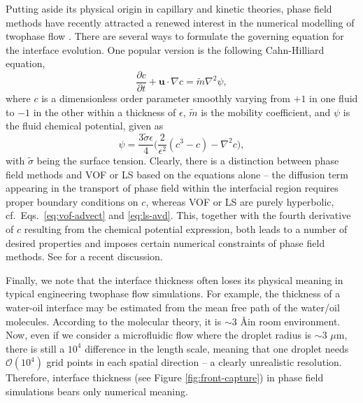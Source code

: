 Putting aside its physical origin in capillary and kinetic theories, phase field methods have recently attracted a renewed interest in the numerical modelling of twophase flow \citep{jacqmin_1999a, Jacqmin2000, Badalassi_etal_2003, Ding_Spelt_Shu2007, Shen_Yang_2010, dong_shen_2012a, Wang_Shu_Shao_Wu_Niu_2015, Martin, Mirjalili_Ivey_Mani_2020}.
There are several ways to formulate the governing equation for the interface evolution. One popular version is the following Cahn-Hilliard equation,
\begin{equation} \label{eq:C-H}
  \frac{\partial c}{\partial t} + {\bm u}\cdot \nabla c =\tilde{m}\nabla ^2 \psi,
\end{equation}
where $c$ is a dimensionless order parameter smoothly varying from $+1$ in one fluid to $-1$ in the other within a thickness of $\epsilon$,
$\tilde{m}$ is the mobility coefficient,
and $\psi$ is the fluid chemical potential, given as
\begin{equation} \label{eq:ch-chem}
  \psi = \frac{3\tilde{\sigma} \epsilon}{4} 
  \bigg(\frac{2}{\epsilon^2}(c^3-c) -\nabla ^2 c \bigg),
\end{equation}
with $\tilde{\sigma}$ being the surface tension.
Clearly, there is a distinction between phase field methods and VOF or LS based on the equations alone --
the diffusion term appearing in the transport of phase field within the interfacial region requires proper boundary conditions on $c$, whereas VOF or LS are purely hyperbolic, cf.\ Eqs.\ \eqref{eq:vof-advect} and \eqref{eq:ls-avd}.
This, together with the fourth derivative of $c$ resulting from the chemical potential expression, both leads to a number of desired properties and imposes certain numerical constraints of phase field methods.
See \cite{Mirjalili_Ivey_Mani_2020} for a recent discussion.

Finally, we note that the interface thickness often loses its physical meaning in typical engineering twophase flow simulations. 
For example, the thickness of a water-oil interface may be estimated from the mean free path of the water/oil molecules. According to the molecular theory, it is $\sim 3$ \AA \enspace in room environment. Now, even if we consider a microfluidic flow where the droplet radius is $\sim 3$ $\mu$m, there is still a $10^{4}$ difference in the length scale, meaning that one droplet needs $\mathcal{O}(10^{4})$ grid points in each spatial direction -- a clearly unrealistic resolution.
Therefore, interface thickness (see Figure \ref{fig:front-capture}) in phase field simulations bears only numerical meaning.


